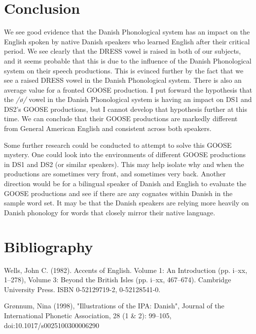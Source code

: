 \section{Conclusion}
 
 \quad We see good evidence that the Danish Phonological system has an impact on the English spoken by native Danish speakers who learned English after their critical period. We see clearly that the DRESS vowel is raised in both of our subjects, and it seems probable that this is due to the influence of the Danish Phonological system on their speech productions. This is evinced further by the fact that we see a raised DRESS vowel in the Danish Phonological system. There is also an average value for a fronted GOOSE production. I put forward the hypothesis that the \emph{/{\o}/} vowel in the Danish Phonological system is having an impact on DS1 and DS2's GOOSE productions, but I cannot develop that hypothesis further at this time. We can conclude that their GOOSE productions are markedly different from General American English and consistent across both speakers.
 
 \bigskip
 
    Some further research could be conducted to attempt to solve this GOOSE mystery. One could look into the environments of different GOOSE productions in DS1 and DS2 (or similar speakers). This may help isolate why and when the productions are sometimes very front, and sometimes very back. Another direction would be for a bilingual speaker of Danish and English to evaluate the GOOSE productions and see if there are any cognates within Danish in the sample word set. It may be that the Danish speakers are relying more heavily on Danish phonology for words that closely mirror their native language. 

\bigskip
\bigskip

\section{Bibliography}
\bigskip

\quad Wells, John C. (1982). Accents of English. Volume 1: An Introduction (pp. i–xx, 1–278), Volume 3: Beyond the British Isles (pp. i–xx, 467–674). Cambridge University Press. ISBN 0-52129719-2, 0-52128541-0. 
\bigskip


\bigskip
\par
Grønnum, Nina (1998), "Illustrations of the IPA: Danish", Journal of the International Phonetic Association, 28 (1 & 2): 99–105, doi:10.1017/s0025100300006290
\bigskip
\par





